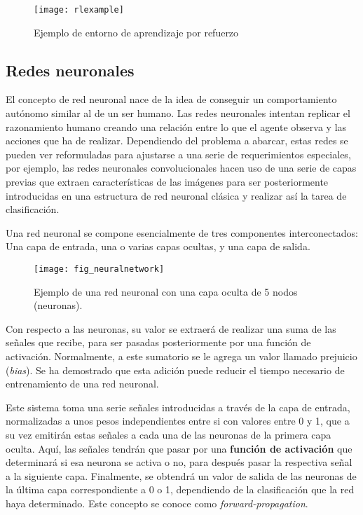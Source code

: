 \documentclass[11pt,spanish,listoffigures,listoftables]{tfgetsinf}
\begin{document}
\begin{figure}[h]
	\centering
	\texttt{[image: rlexample]}
	\caption{Ejemplo de entorno de aprendizaje por refuerzo}
\end{figure}


\subsection{Redes neuronales}

El concepto de red neuronal nace de la idea de conseguir un comportamiento autónomo similar al de un ser humano. Las redes neuronales intentan replicar el razonamiento humano creando una relación entre lo que el agente observa y las acciones que ha de realizar. Dependiendo del problema a abarcar, estas redes se pueden ver reformuladas para ajustarse a una serie de requerimientos especiales, por ejemplo, las redes neuronales convolucionales hacen uso de una serie de capas previas que extraen características de las imágenes para ser posteriormente introducidas en una estructura de red neuronal clásica y realizar así la tarea de clasificación.

Una red neuronal se compone esencialmente de tres componentes interconectados: Una capa de entrada, una o varias capas ocultas, y una capa de salida.

\begin{figure}[h]
	\centering
	\texttt{[image: fig\_neuralnetwork]}
	\caption{Ejemplo de una red neuronal con una capa oculta de 5 nodos (neuronas).}
	
\end{figure}

Con respecto a las neuronas, su valor se extraerá de realizar una suma de las señales que recibe, para ser pasadas posteriormente por una función de activación. Normalmente, a este sumatorio se le agrega un valor llamado prejuicio (\textit{bias}). Se ha demostrado que esta adición puede reducir el tiempo necesario de entrenamiento de una red neuronal.

Este sistema toma una serie señales introducidas a través de la capa de entrada, normalizadas a unos pesos independientes entre si con valores entre 0 y 1, que a su vez emitirán estas señales a cada una de las neuronas de la primera capa oculta. Aquí, las señales tendrán que pasar por una \textbf{función de activación} que determinará si esa neurona se activa o no, para después pasar la respectiva señal a la siguiente capa. Finalmente, se obtendrá un valor de salida de las neuronas de la última capa correspondiente a 0 o 1, dependiendo de la clasificación que la red haya determinado. Este concepto se conoce como \textit{forward-propagation}.
\end{document}
